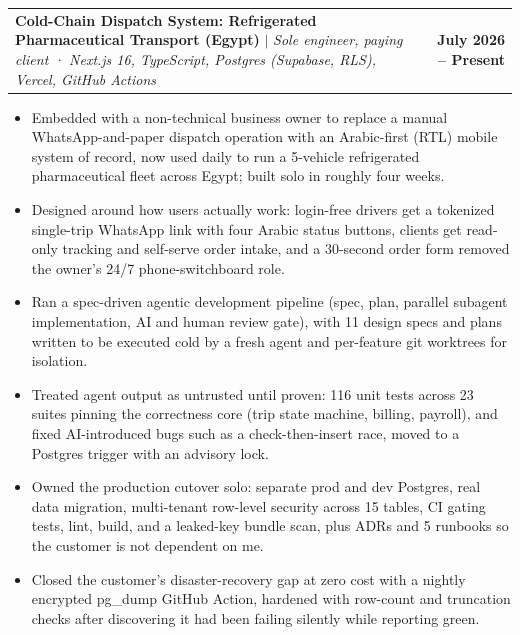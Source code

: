 \documentclass[letterpaper,11pt]{article}
\makeatletter
\newcommand{\resumeItem}[1]{
  \item\small{{#1 \vspace{-2pt}}}
}
\newcommand{\resumeProjectHeading}[2]{
    \item
    \begin{tabular*}{1.001\textwidth}{@{}>{\raggedright\arraybackslash}p{0.80\textwidth}@{\extracolsep{\fill}}r@{}}
      \small#1 & \textbf{\small #2}\\
    \end{tabular*}\vspace{-7pt}
}
\newcommand{\resumeItemListStart}{\begin{itemize}}
\newcommand{\resumeItemListEnd}{\end{itemize}\vspace{-5pt}}
\makeatother
\begin{document}
      \resumeProjectHeading
        {\textbf{Cold-Chain Dispatch System: Refrigerated Pharmaceutical Transport (Egypt)} $|$ \emph{Sole engineer, paying client · Next.js 16, TypeScript, Postgres (Supabase, RLS), Vercel, GitHub Actions}}{July 2026 -- Present}
        \resumeItemListStart
          \resumeItem{Embedded with a non-technical business owner to replace a manual WhatsApp-and-paper dispatch operation with an Arabic-first (RTL) mobile system of record, now used daily to run a 5-vehicle refrigerated pharmaceutical fleet across Egypt; built solo in roughly four weeks.}
          \resumeItem{Designed around how users actually work: login-free drivers get a tokenized single-trip WhatsApp link with four Arabic status buttons, clients get read-only tracking and self-serve order intake, and a 30-second order form removed the owner's 24/7 phone-switchboard role.}
          \resumeItem{Ran a spec-driven agentic development pipeline (spec, plan, parallel subagent implementation, AI and human review gate), with 11 design specs and plans written to be executed cold by a fresh agent and per-feature git worktrees for isolation.}
          \resumeItem{Treated agent output as untrusted until proven: 116 unit tests across 23 suites pinning the correctness core (trip state machine, billing, payroll), and fixed AI-introduced bugs such as a check-then-insert race, moved to a Postgres trigger with an advisory lock.}
          \resumeItem{Owned the production cutover solo: separate prod and dev Postgres, real data migration, multi-tenant row-level security across 15 tables, CI gating tests, lint, build, and a leaked-key bundle scan, plus ADRs and 5 runbooks so the customer is not dependent on me.}
          \resumeItem{Closed the customer's disaster-recovery gap at zero cost with a nightly encrypted pg\_dump GitHub Action, hardened with row-count and truncation checks after discovering it had been failing silently while reporting green.}
        \resumeItemListEnd
        \vspace{-13pt}
\end{document}
